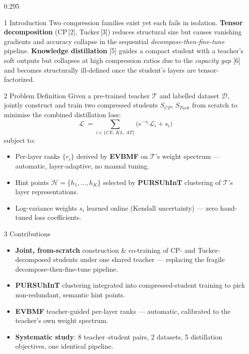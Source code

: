 \documentclass[final]{beamer}
\begin{document}
\begin{frame}[t]{}
\begin{columns}[t,onlytextwidth]
\begin{column}{0.295\textwidth}
\begin{pblock}{1 \;\; Introduction}
Two compression families exist yet each fails in isolation.
\textbf{Tensor decomposition} (CP\,[2], Tucker\,[3]) reduces structural size but
causes vanishing gradients and accuracy collapse in the sequential
\emph{decompose-then-fine-tune} pipeline.
\textbf{Knowledge distillation} [5] guides a compact student with a teacher's
soft outputs but collapses at high compression ratios due to the
\emph{capacity gap} [6] and becomes structurally ill-defined once the
student's layers are tensor-factorized.
\end{pblock}

\vspace{5mm}

\begin{pblock}{2 \;\; Problem Definition}
Given a pre-trained teacher $\mathcal{T}$ and labelled dataset $\mathcal{D}$,
jointly construct and train two compressed students $S_{CP}$, $S_{Tuck}$ from
scratch to minimise the combined distillation loss:
\[\mathcal{L} \;=\!\!\sum_{i\in\{CE,\,KL,\,AT\}}\!\!\big(e^{-s_i}\mathcal{L}_i+s_i\big)\]
subject to:
\begin{itemize}
  \item Per-layer ranks $\{r_i\}$ derived by \textbf{EVBMF} on $\mathcal{T}$'s
        weight spectrum --- automatic, layer-adaptive, no manual tuning.
  \item Hint points $\mathcal{H}\!=\!\{h_1,\dots,h_K\}$ selected by
        \textbf{PURSUhInT} clustering of $\mathcal{T}$'s layer representations.
  \item Log-variance weights $s_i$ learned online (Kendall uncertainty) ---
        zero hand-tuned loss coefficients.
\end{itemize}
\end{pblock}

\vspace{5mm}

\begin{pblock}{3 \;\; Contributions}
\begin{itemize}
  \item \textbf{Joint, from-scratch} construction \& co-training of CP- and
        Tucker-decomposed students under one shared teacher --- replacing the
        fragile decompose-then-fine-tune pipeline.
  \item \textbf{PURSUhInT} clustering integrated into compressed-student
        training to pick non-redundant, semantic hint points.
  \item \textbf{EVBMF} teacher-guided per-layer ranks --- automatic, calibrated
        to the teacher's own weight spectrum.
  \item \textbf{Systematic study}: 8 teacher--student pairs, 2 datasets,
        5 distillation objectives, one identical pipeline.
\end{itemize}
\end{pblock}


\end{column}
\end{columns}
\end{frame}
\end{document}
